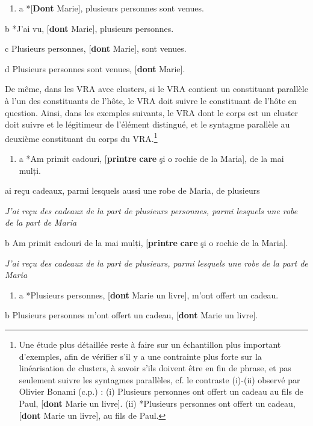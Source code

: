 \begin{enumerate}
\item a  *[\textbf{Dont} Marie], plusieurs personnes sont venues. 


\end{enumerate}
  b  *J'ai vu, [\textbf{dont} Marie], plusieurs personnes.

  c  Plusieurs personnes, [\textbf{dont} Marie], sont venues.

  d  Plusieurs personnes sont venues, [\textbf{dont} Marie].

De même, dans les VRA avec clusters, si le VRA contient un constituant parallèle à l'un des constituants de l'hôte, le VRA doit suivre le constituant de l'hôte en question. Ainsi, dans les exemples suivants, le VRA dont le corps est un cluster doit suivre et le légitimeur de l'élément distingué, et le syntagme parallèle au deuxième constituant du corps du VRA.\footnote{Une étude plus détaillée reste à faire sur un échantillon plus important d'exemples, afin de vérifier s'il y a une contrainte plus forte sur la linéarisation de clusters, à savoir s'ils doivent être en fin de phrase, et pas seulement suivre les syntagmes parallèles, cf. le contraste (i)-(ii) observé par Olivier Bonami (c.p.) :
(i)  Plusieurs personnes ont offert un cadeau au fils de Paul, [\textbf{dont} Marie un livre].
(ii)  *Plusieurs personnes ont offert un cadeau, [\textbf{dont} Marie un livre], au fils de Paul.} 


\begin{enumerate}
\item a  *Am primit cadouri, [\textbf{printre} \textbf{care} şi o rochie de la Maria], de la mai mulți.


\end{enumerate}
ai reçu cadeaux, parmi lesquels aussi une robe de Maria, de plusieurs

{\itshape
J'ai reçu des cadeaux de la part de plusieurs personnes, parmi lesquels une robe de la part de Maria} 

  b  Am primit cadouri de la mai mulți, [\textbf{printre} \textbf{care} şi o rochie de la Maria]. 

{\itshape
J'ai reçu des cadeaux de la part de plusieurs, parmi lesquels une robe de la part de Maria}


\begin{enumerate}
\item a  *Plusieurs personnes, [\textbf{dont} Marie un livre], m'ont offert un cadeau. 


\end{enumerate}
  b  Plusieurs personnes m'ont offert un cadeau, [\textbf{dont} Marie un livre]. 

